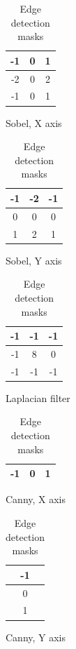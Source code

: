 \begin{table}[ht]	
	\begin{subtable}[b]{0.2\textwidth}
		\centering
		\begin{tabular}{|c|c|c|}
			\hline 
			-1 & 0 & 1 \\ \hline
			-2 & 0 & 2 \\ \hline
			-1 & 0 & 1 \\ \hline
		\end{tabular}
		\caption{Sobel, X axis}
		\label{tab:edge detection:sobel:x}
	\end{subtable}%
	\begin{subtable}[b]{0.2\textwidth}
		\centering
		\begin{tabular}{|c|c|c|}
			\hline 
			-1 & -2 & -1 \\ \hline
			0 & 0 & 0 \\ \hline
			1 & 2 & 1 \\ \hline
		\end{tabular}
		\caption{Sobel, Y axis}
		\label{tab:edge detection:sobel:y}	
	\end{subtable}%
	\begin{subtable}[b]{0.2\textwidth}
		\centering
		\begin{tabular}{|c|c|c|}
			\hline 
			-1 & -1 & -1 \\ \hline
			-1 & 8  & 0 \\ \hline
			-1 & -1 & -1 \\ \hline
		\end{tabular}
		\caption{Laplacian filter}
		\label{tab:edge detection:laplacian}
	\end{subtable}%
	\begin{subtable}[b]{0.2\textwidth}
		\centering
		\begin{tabular}{|c|c|c|}
			\hline
			-1 & 0 & 1 \\ \hline
		\end{tabular}
		\caption{Canny, X axis}
		\label{tab:edge detection:canny:x}
	\end{subtable}%
	\begin{subtable}[b]{0.2\textwidth}
		\centering
		\begin{tabular}{|c|}
			\hline
			-1 \\ \hline
			0 \\ \hline
			1 \\ \hline
		\end{tabular}
		\caption{Canny, Y axis}
		\label{tab:edge detection:canny:y}
	\end{subtable}
	
	\centering 
	\caption{Edge detection masks}
	\label{tab:edge detection:masks}
\end{table}

